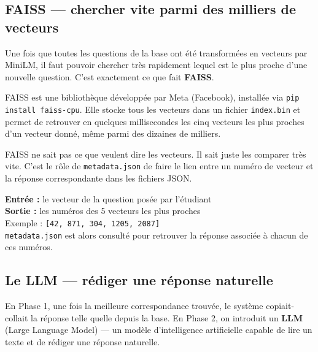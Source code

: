 \documentclass[11pt,a4paper]{article}
\begin{document}
\subsection{FAISS --- chercher vite parmi des milliers de vecteurs}

Une fois que toutes les questions de la base ont été transformées
en vecteurs par MiniLM, il faut pouvoir chercher très rapidement
lequel est le plus proche d'une nouvelle question. C'est exactement
ce que fait \textbf{FAISS}.

FAISS est une bibliothèque développée par Meta (Facebook),
installée via \texttt{pip install faiss-cpu}. Elle stocke
tous les vecteurs dans un fichier \texttt{index.bin} et
permet de retrouver en quelques millisecondes les cinq vecteurs
les plus proches d'un vecteur donné, même parmi des dizaines
de milliers.

FAISS ne sait pas ce que veulent dire les vecteurs. Il sait
juste les comparer très vite. C'est le rôle de \texttt{metadata.json}
de faire le lien entre un numéro de vecteur et la réponse
correspondante dans les fichiers JSON.

\begin{schema}
\textbf{Entrée :} le vecteur de la question posée par l'étudiant \\
\textbf{Sortie :} les numéros des 5 vecteurs les plus proches \\
\vspace{0.3cm}
Exemple : \texttt{[42, 871, 304, 1205, 2087]} \\
\vspace{0.3cm}
\texttt{metadata.json} est alors consulté pour retrouver
la réponse associée à chacun de ces numéros.
\end{schema}

\subsection{Le LLM --- rédiger une réponse naturelle}

En Phase 1, une fois la meilleure correspondance trouvée,
le système copiait-collait la réponse telle quelle depuis
la base. En Phase 2, on introduit un \textbf{LLM} (Large
Language Model) --- un modèle d'intelligence artificielle
capable de lire un texte et de rédiger une réponse naturelle.
\end{document}
